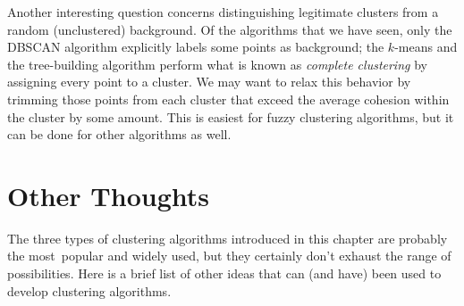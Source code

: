 Another interesting question concerns distinguishing legitimate
clusters from a random (unclustered) background. Of the algorithms
that we have seen, only the DBSCAN algorithm  explicitly labels some 
points as background; the $k$-means and the tree-building algorithm
perform what is known as \emph{complete clustering}  by assigning every
point to a cluster. We may want to relax this behavior by trimming
those points from each cluster that exceed the average cohesion within
the cluster by some amount.  This is easiest for fuzzy clustering
algorithms, but it can be done for other algorithms as well.

\vspace*{-9pt}
\section{Other Thoughts}

  
The three types of clustering algorithms introduced in this chapter
are probably the most~popular and widely\vadjust{\pagebreak} used, but they certainly
don't exhaust the range of possibilities. Here is a brief list of
other ideas that can (and have) been used to develop clustering
algorithms.

